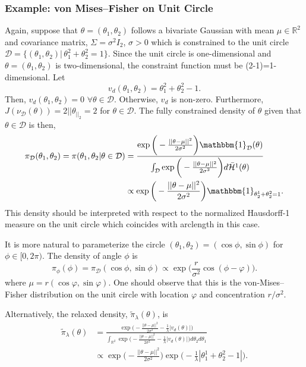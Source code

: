 \documentclass[10pt,fleqn]{article}
\DeclareMathOperator{\1}{\mathbbm{1}}
\begin{document}
\subsubsection{Example: von Mises--Fisher on Unit Circle}
Again, suppose that $\theta = (\theta_1,\theta_2)$ follows a bivariate Gaussian with mean $\mu \in\mathbb{R}^2$ and covariance matrix, $\Sigma = \sigma^2 I_2$, $\sigma > 0$ which is constrained to the unit circle $\mathcal{D} = \{(\theta_1,\theta_2) | \, \theta_1^2+\theta_2^2 = 1\}.$  Since the unit circle is one-dimensional and $\theta = (\theta_1,\theta_2)$ is two-dimensional, the constraint function must be (2-1)=1-dimensional. Let $$v_d(\theta_1,\theta_2) = \theta_1^2+\theta_2^2 -1.$$
Then, $v_d(\theta_1,\theta_2) = 0$ $\forall \theta\in\mathcal{D}$. Otherwise, $v_d$ is non-zero.  Furthermore, $J(\nu_\mathcal{D}(\theta)) = 2||\theta_||_2 = 2$ for $\theta\in\mathcal{D}.$ The fully constrained density of $\theta$ given that $\theta\in \mathcal{D}$ is then,
\begin{align*}
\pi_\mathcal{D}(\theta_1,\theta_2)= \pi(\theta_1,\theta_2|\theta\in\mathcal{D})&= \frac{\exp\bigg(-\frac{||\theta-\mu||^2}{2\sigma^2}\bigg)\mathbbm{1}_\mathcal{D}(\theta)}{\int_\mathcal{D} \exp\bigg(-\frac{||\theta-\mu||^2}{2\sigma^2}\bigg)d\bar{\mathcal{H}}^{1}(\theta) }\\
&\propto \exp\bigg(-\frac{||\theta-\mu||^2}{2\sigma^2}\bigg) \mathbbm{1}_{\theta_2^1 + \theta_2^2 = 1} .
\end{align*}
This density should be interpreted with respect to the normalized Hausdorff-1 measure on the unit circle which coincides with arclength in this case.

It is more natural to parameterize the circle $(\theta_1,\theta_2) = (\cos \phi, \sin \phi) $ for $\phi \in [0,2\pi).$ The density of angle $\phi$ is 
\begin{equation*}
\pi_\phi(\phi) = \pi_\mathcal{D}(\cos \phi,\sin\phi) \propto \exp\bigg( \frac{r}{\sigma^2} \cos(\phi -\varphi) \bigg).
\end{equation*}
where $\mu = r(\cos \varphi,\sin \varphi).$ One should observe that this is the von-Mises--Fisher distribution on the unit circle with location $\varphi$ and concentration $r/\sigma^2$.  

Alternatively, the relaxed density, $\tilde{\pi}_\lambda(\theta)$, is
\begin{equation}
\begin{split}
\tilde{\pi}_\lambda(\theta) &=\frac{\exp\bigg(-\frac{||\theta-\mu||^2}{2\sigma^2} - \frac{1}{\lambda}|v_d(\theta)| \bigg)}{\int_{\mathbb{R}^2} \exp\bigg(-\frac{||\theta-\mu||^2}{2\sigma^2}-\frac{1}{\lambda}|v_d(\theta)| \bigg)d\theta_2d\theta_1}\\
& \propto \exp\bigg(-\frac{||\theta-\mu||^2}{2\sigma^2}\bigg)\exp\bigg( - \frac{1}{\lambda}|\theta_1^1+\theta_2^2-1| \bigg).
\end{split}
\label{EQ:Relaxed_Density_Bivariate_Unit_Circle}
\end{equation}
\end{document}
